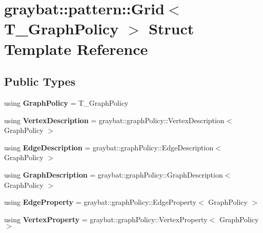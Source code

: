 \hypertarget{structgraybat_1_1pattern_1_1Grid}{}\section{graybat\+:\+:pattern\+:\+:Grid$<$ T\+\_\+\+Graph\+Policy $>$ Struct Template Reference}
\label{structgraybat_1_1pattern_1_1Grid}
\subsection*{Public Types}
\begin{DoxyCompactItemize}
\item 
\hypertarget{structgraybat_1_1pattern_1_1Grid_aab349845fbbbc8faaec2fc21f9dab618}{}using {\bfseries Graph\+Policy} = T\+\_\+\+Graph\+Policy\label{structgraybat_1_1pattern_1_1Grid_aab349845fbbbc8faaec2fc21f9dab618}

\item 
\hypertarget{structgraybat_1_1pattern_1_1Grid_a676f95ffaf25de5c9a14775e12d80991}{}using {\bfseries Vertex\+Description} = graybat\+::graph\+Policy\+::\+Vertex\+Description$<$ Graph\+Policy $>$\label{structgraybat_1_1pattern_1_1Grid_a676f95ffaf25de5c9a14775e12d80991}

\item 
\hypertarget{structgraybat_1_1pattern_1_1Grid_a8a6cbcea3f2e986387bd56b24c25969c}{}using {\bfseries Edge\+Description} = graybat\+::graph\+Policy\+::\+Edge\+Description$<$ Graph\+Policy $>$\label{structgraybat_1_1pattern_1_1Grid_a8a6cbcea3f2e986387bd56b24c25969c}

\item 
\hypertarget{structgraybat_1_1pattern_1_1Grid_a6ac54ff08812061adb655b098b78658d}{}using {\bfseries Graph\+Description} = graybat\+::graph\+Policy\+::\+Graph\+Description$<$ Graph\+Policy $>$\label{structgraybat_1_1pattern_1_1Grid_a6ac54ff08812061adb655b098b78658d}

\item 
\hypertarget{structgraybat_1_1pattern_1_1Grid_ae3d9d041926f8480aad0df1023a977e2}{}using {\bfseries Edge\+Property} = graybat\+::graph\+Policy\+::\+Edge\+Property$<$ Graph\+Policy $>$\label{structgraybat_1_1pattern_1_1Grid_ae3d9d041926f8480aad0df1023a977e2}

\item 
\hypertarget{structgraybat_1_1pattern_1_1Grid_a616b9ec5554ff55277d73e434f30c5ae}{}using {\bfseries Vertex\+Property} = graybat\+::graph\+Policy\+::\+Vertex\+Property$<$ Graph\+Policy $>$\label{structgraybat_1_1pattern_1_1Grid_a616b9ec5554ff55277d73e434f30c5ae}

\end{DoxyCompactItemize}
